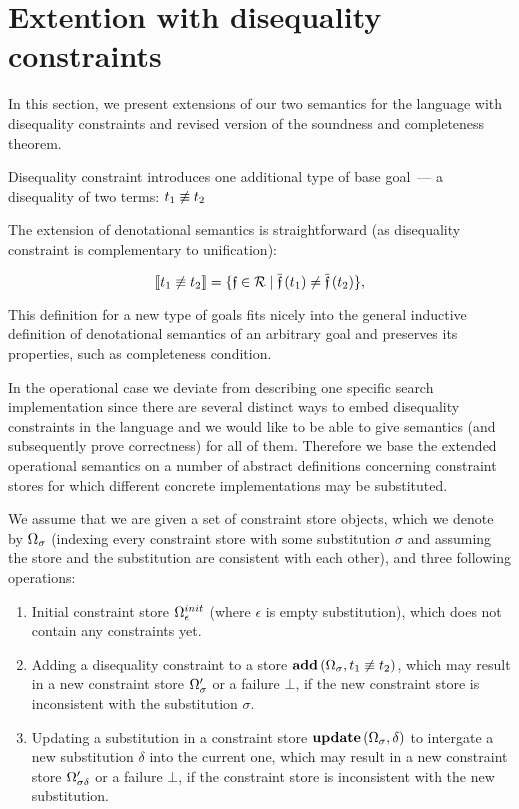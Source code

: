 \section{Extention with disequality constraints}

In this section, we present extensions of our two semantics for the language with disequality constraints and revised version of the soundness and completeness theorem.

Disequality constraint introduces one additional type of base goal~--- a disequality of two terms: $t_1 \not\equiv t_2$

The extension of denotational semantics is straightforward (as disequality constraint is complementary to unification):

\[ \llbracket{t_1 \not\equiv t_2}\rrbracket  =  \{\mathfrak{f} \in \mathcal{R} \mid \overline{\mathfrak{f}}\,(t_1) \neq \overline{\mathfrak{f}}\,(t_2)\}, \]

This definition for a new type of goals fits nicely into the general inductive definition of denotational semantics of an arbitrary goal
and preserves its properties, such as completeness condition.

In the operational case we deviate from describing one specific search implementation since there are several distinct ways to embed disequality constraints
in the language and we would like to be able to give semantics (and subsequently prove correctness) for all of them. Therefore we base the extended operational
semantics on a number of abstract definitions concerning constraint stores for which different concrete implementations may be substituted.

We assume that we are given a set of constraint store objects, which we denote by $\Omega_\sigma$ (indexing every constraint store with
some substitution $\sigma$ and assuming the store and the substitution are consistent with each other), and three following operations:

\begin{enumerate}
\item Initial constraint store $\Omega_\epsilon^{init}$ (where $\epsilon$ is empty substitution), which does not contain any constraints yet.
\item Adding a disequality constraint to a store $\mathbf{add}\,(\Omega_\sigma, t_1 \not\equiv t_2)$, which may result in a new constraint store $\Omega^\prime_\sigma$ or a failure $\bot$,
  if the new constraint store is inconsistent with the substitution $\sigma$.
\item Updating a substitution in a constraint store $\mathbf{update}\,(\Omega_\sigma, \delta)$ to intergate a new substitution $\delta$ into the current one,
  which may result in a new constraint store $\Omega^\prime_{\sigma \delta}$ or a failure $\bot$, if the constraint store is inconsistent with the new substitution.
\end{enumerate}

